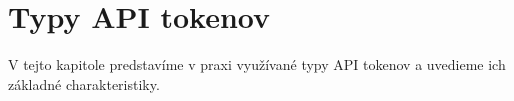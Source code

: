 \chapter{Typy API tokenov}

\label{kap:typy} %

V tejto kapitole predstavíme v praxi využívané typy API tokenov a uvedieme ich základné charakteristiky.
